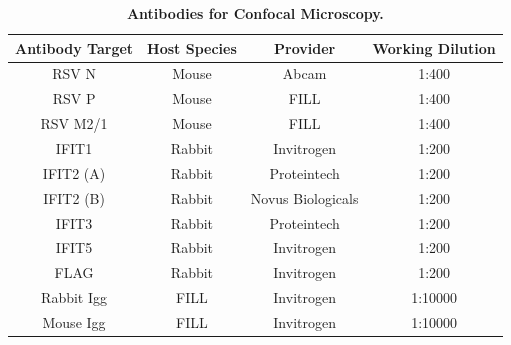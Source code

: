 \begin{table}
\centering
\begin{tabular}{@{}cccc@{}}
\toprule
\textbf{Antibody Target} & \textbf{Host Species} & \textbf{Provider} & \textbf{Working Dilution} \\ \midrule
RSV N       & Mouse  & Abcam             & 1:400   \\
RSV P       & Mouse  & FILL              & 1:400   \\
RSV   M2/1  & Mouse  & FILL              & 1:400   \\
IFIT1       & Rabbit & Invitrogen        & 1:200   \\
IFIT2   (A) & Rabbit & Proteintech       & 1:200   \\
IFIT2 (B)   & Rabbit & Novus Biologicals & 1:200   \\
IFIT3       & Rabbit & Proteintech       & 1:200   \\
IFIT5       & Rabbit & Invitrogen              & 1:200   \\
FLAG        & Rabbit & Invitrogen              & 1:200   \\
Rabbit Igg  & FILL   & Invitrogen              & 1:10000 \\
Mouse   Igg & FILL   & Invitrogen              & 1:10000 \\ \bottomrule
\end{tabular}
\caption[Antibodies for Confocal Microscopy.]{\textbf{Antibodies for Confocal Microscopy.}}
\label{Antibodies for Confocal Microscopy}
\end{table}




